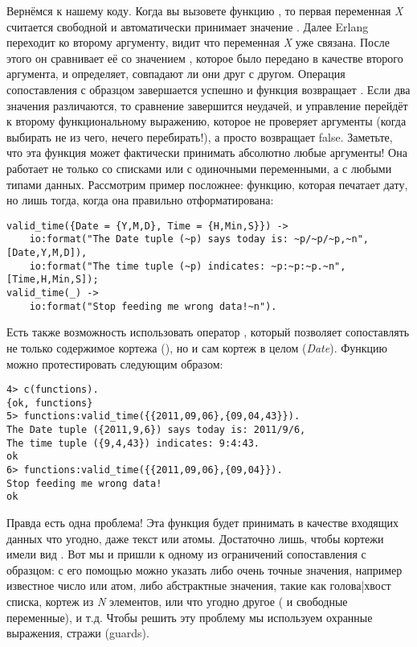 Вернёмся к нашему коду. Когда вы вызовете функцию , то первая переменная \emph{X} считается свободной и автоматически принимает значение . Далее Erlang переходит ко второму аргументу, видит что переменная \emph{X} уже связана. После этого он сравнивает её со значением , которое было передано в качестве второго аргумента, и определяет, совпадают ли они друг с другом. Операция сопоставления с образцом завершается успешно и функция возвращает . Если два значения различаются, то сравнение завершится неудачей, и управление перейдёт к второму функциональному выражению, которое не проверяет аргументы (когда выбирать не из чего, нечего перебирать!), а просто возвращает false. Заметьте, что эта функция может фактически принимать абсолютно любые аргументы! Она работает не только со списками или с одиночными переменными, а с любыми типами данных. Рассмотрим пример посложнее: функцию, которая печатает дату, но лишь тогда, когда она правильно отформатирована:
\begin{lstlisting}[style=erlang]
valid_time({Date = {Y,M,D}, Time = {H,Min,S}}) ->
    io:format("The Date tuple (~p) says today is: ~p/~p/~p,~n",[Date,Y,M,D]),
    io:format("The time tuple (~p) indicates: ~p:~p:~p.~n", [Time,H,Min,S]);
valid_time(_) ->
    io:format("Stop feeding me wrong data!~n").
\end{lstlisting}

Есть также возможность использовать оператор \ops{\strut=}, который позволяет сопоставлять не только содержимое кортежа (), но и сам кортеж в целом (\emph{Date}). Функцию можно протестировать следующим образом:
\begin{lstlisting}[style=erlang]
4> c(functions).
{ok, functions}
5> functions:valid_time({{2011,09,06},{09,04,43}}).
The Date tuple ({2011,9,6}) says today is: 2011/9/6,
The time tuple ({9,4,43}) indicates: 9:4:43.
ok
6> functions:valid_time({{2011,09,06},{09,04}}).
Stop feeding me wrong data!
ok
\end{lstlisting}

Правда есть одна проблема! Эта функция будет принимать в качестве входящих данных что угодно, даже текст или атомы. Достаточно лишь, чтобы кортежи имели вид . Вот мы и пришли к одному из ограничений сопоставления с образцом: с его помощью можно указать либо очень точные значения, например известное число или атом, либо абстрактные значения, такие как голова|хвост списка, кортеж из \emph{N} элементов, или что угодно другое (\ops{\strut\_} и свободные переменные), и т.д. Чтобы решить эту проблему мы используем охранные выражения, стражи (guards). 
